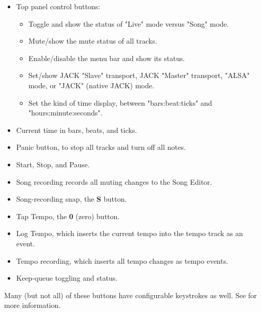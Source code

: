 \documentclass[
 11pt,
 twoside,
 a4paper,
 headinclude,
 footinclude,
 final                                 %
]{article}
\begin{document}
   \begin{itemize}
      \item Top panel control buttons:
      \begin{itemize}
         \item Toggle and show the status of "Live" mode versus "Song" mode.
         \item Mute/show the mute status of all tracks.
         \item Enable/disable the menu bar and show its status.
         \item Set/show JACK "Slave" transport, JACK "Master" transport,
            "ALSA" mode, or "JACK" (native JACK) mode.
         \item Set the kind of time display, between "bars:beat:ticks"
            and "hours:minute:seconds".
      \end{itemize}
      \item Current time in bars, beats, and ticks.
      \item Panic button, to stop all tracks and turn off all notes.
      \item Start, Stop, and Pause.
      \item Song recording records all muting changes to the Song Editor.
      \item Song-recording snap, the \textbf{S} button.
      \item Tap Tempo, the \textbf{0} (zero) button.
      \item Log Tempo, which inserts the current tempo into the tempo track
         as an event.
      \item Tempo recording, which inserts all tempo changes as tempo events.
      \item Keep-queue toggling and status.
   \end{itemize}

   Many (but not all) of these buttons have configurable keystrokes as well.
   See  for more information.

%


\rhead{\rightmark}         %
\end{document}

